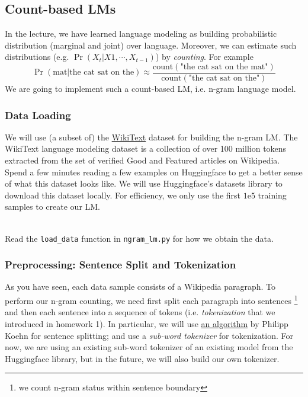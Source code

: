 \subsection{Count-based LMs}
\label{subsubsec:count-based lms}
In the lecture, we have learned language modeling as building probabilistic distribution (marginal and joint) over language. Moreover, we can estimate such distributions (e.g. $\Pr(X_t|X1, \cdots, X_{t-1})$) by \textit{counting}. For example $$\Pr(\textrm{mat} | \textrm{the cat sat on the}) \approx \frac{\textrm{count}(\textrm{"the cat sat on the mat"})}{\textrm{count}(\textrm{"the cat sat on the"})} $$
We are going to implement such a count-based LM, i.e. n-gram language model.

\subsubsection{Data Loading}
We will use (a subset of) the \href{https://huggingface.co/datasets/wikitext}{WikiText} dataset for building the n-gram LM. The WikiText language modeling dataset is a collection of over 100 million tokens extracted from the set of verified Good and Featured articles on Wikipedia. 
Spend a few minutes reading a few examples on Huggingface to get a better sense of what this dataset looks like. We will use Huggingface's datasets library to download this dataset locally. For efficiency, we only use the first $1\textrm{e}5$ training samples to create our LM.\\\

\noindent Read the \texttt{load\_data} function in \texttt{ngram\_lm.py} for how we obtain the data.

\subsubsection{Preprocessing: Sentence Split and Tokenization}
As you have seen, each data sample consists of a Wikipedia paragraph. To perform our n-gram counting, we need first split each paragraph into sentences \footnote{we count n-gram status within sentence boundary} and then each sentence into a sequence of tokens (i.e. \textit{tokenization} that we introduced in homework 1).
In particular, we will use \href{https://aclanthology.org/W07-0733/}{an algorithm} by Philipp Koehn for sentence splitting; and use a \textit{sub-word tokenizer} for tokenization. For now, we are using an existing sub-word tokenizer of an existing model from the Huggingface library, but in the future, we will also build our own tokenizer.

